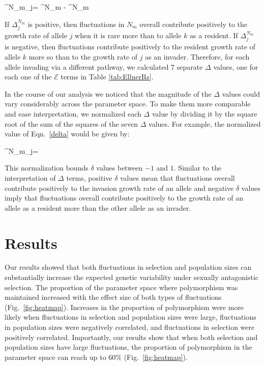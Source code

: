 \documentclass[12pt]{article}
\let\oldequation\equation
\let\oldendequation\endequation
\renewenvironment{equation}
  {\linenomathNonumbers\oldequation}
  {\oldendequation\endlinenomath}
\begin{document}
\begin{equation}
\Delta^{N_{m}}_{j}= ^{N_{m}} - ^{N_{m}}
\label{delta}
\end{equation}

If $\Delta^{N_{m}}_{j}$ is positive, then fluctuations in $N_{m}$ overall contribute positively to the growth rate of allele $j$ when it is rare more than to allele $k$ as a resident. If $\Delta^{N_{m}}_{j}$ is negative, then fluctuations contribute positively to the resident growth rate of allele $k$ more so than to the growth rate of $j$ as an invader. Therefore, for each allele invading via a different pathway, we calculated 7 separate $\Delta$ values, one for each one of the $\mathcal{E}$ terms in Table \ref{tab:EllnerRs}.


In the course of our analysis we noticed that the magnitude of the $\Delta$ values could vary considerably across the parameter space. To make them more comparable and ease interpretation, we normalized each $\Delta$ value by dividing it by the square root of the sum of the squares of the seven $\Delta$ values. For example, the normalized value of Eqn.~\ref{delta} would be given by:



\begin{equation}
  \delta^{N_{m}}_{j}= 
\end{equation}

This normalization bounds $\delta$ values between $-1$ and $1$. Similar to the interpretation of $\Delta$ terms, positive $\delta$ values mean that fluctuations overall contribute positively to the invasion growth rate of an allele and negative $\delta$ values imply that fluctuations overall contribute positively to the growth rate of an allele as a resident more than the other allele as an invader.


\section{Results}
Our results showed that both fluctuations in selection and population sizes can substantially increase the expected genetic variability under sexually antagonistic selection. The proportion of the parameter space where polymorphism was maintained increased with the effect size of both types of fluctuations (Fig.~\ref{fig:heatmap}). Increases in the proportion of polymorphism were more likely when fluctuations in selection and population sizes were large, fluctuations in population sizes were negatively correlated, and fluctuations in selection were positively correlated. Importantly, our results show that when both selection and population sizes have large fluctuations, the proportion of polymorphism in the parameter space can reach up to $60\% $ (Fig.~\ref{fig:heatmap}).
\end{document}
